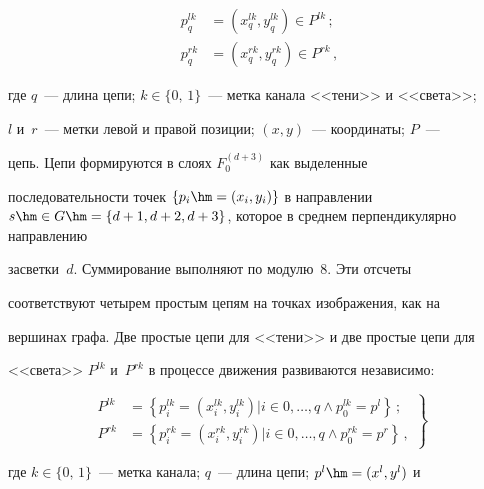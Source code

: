   \begin{align*}


  p_q^{lk} &= \left( x_q^{lk},y_q^{lk}\right)\in P^{lk}\,;\\


  p_q^{rk} &= \left( x_q^{rk},y_q^{rk}\right)\in P^{rk}\,,




  \end{align*}


где $q$~--- длина цепи; $k\in \{0,\,1\}$~---  метка канала <<тени>> и <<света>>; 


$l$ и~$r$~---  метки левой и правой позиции; $(x,y)$~---  координаты; $P$~---  


цепь. Цепи формируются в слоях $F_0^{(d+3)}$ как выделенные 


последовательности точек $\{p_i \hm= (x_i,y_i)\}$ в направлении $s\hm\in 


G\hm= \{d+1,d+2,d+3\}$, которое в среднем перпендикулярно направлению 


засветки~$d$. Суммирование выполняют по модулю~8. Эти отсчеты 


соответствуют четырем простым цепям на точках изображения, как на 


вершинах графа. Две простые цепи для <<тени>> и две простые цепи для 


<<света>> $P^{lk}$ и~$P^{rk}$ в процессе движения развиваются независимо:


\begin{equation}


\left.


\begin{array}{rl}


P^{lk} &= \left\{ p_i^{lk} = \left( x_i^{lk},y_i^{lk}\right) \vert i\in 0, \ldots ,q\wedge


p_0^{lk}=p^l\right\}\,;\\[9pt]


P^{rk} &= \left\{ p_i^{rk} = \left( x_i^{rk},y_i^{rk}\right) \vert i\in 0, \ldots ,q\wedge 


p_0^{rk}=p^r\right\}\,,


\end{array}


\right\}


\label{e10-gk}


\end{equation}


где $k\in \{0,\,1\}$~---  метка канала; $q$~---   длина цепи; $p^l\hm=(x^l,y^l)$ и 


